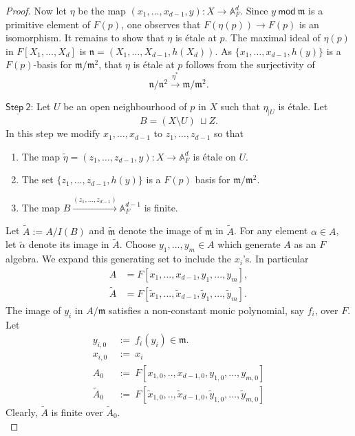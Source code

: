 \documentclass[10pt]{amsart}
\theoremstyle{plain}
\theoremstyle{definition}
\renewcommand{\tilde}{\widetilde}
\newcommand{\A}{{\mathbb A}}
\let\syn\mathsf
\newcommand{\Step}[1]{\underline{\syn{Step \ {#1}}}}
\newcommand{\scr}{\scriptscriptstyle}
\begin{document}
\begin{proof}
Now let $\eta$ be the map $(x_1,\ldots,x_{d-1},{y}):X \xrightarrow{} \A^d_F$. Since $y \ \syn{mod} \ \mathfrak{m}$ is a primitive element of $F(p)$, one observes that $F(\eta(p)) \to F(p)$ is an isomorphism. It remains to show that $\eta$ is \'{e}tale at $p$.  The maximal ideal of $\eta(p)$ in $F[X_1,...,X_d]$ is $\mathfrak{n}=(X_1,\ldots,X_{d-1},h(X_d))$.  
As $\{x_1,\ldots,x_{d-1},h(y)\}$ is a $F(p)$-basis for $\mathfrak{m}/\mathfrak{m}^2$, {that $\eta$ is \'{e}tale at $p$} follows from the surjectivity of 
$$\mathfrak{n}/\mathfrak{n}^2\xrightarrow{\eta^*}\mathfrak{m}/\mathfrak{m}^2 .$$


\noindent$\Step {2}$:
Let $U$ be an open neighbourhood  of $p$ in $X$ such that $\eta_{\scr{|U}}$ is \'{e}tale. Let $$ B= (X\setminus U) \ \sqcup Z.$$
In this step we modify $x_1,\ldots,x_{d-1}$ to $z_1,\ldots,z_{d-1}$ so that
\begin{enumerate}
\item  The map $\tilde{\eta}=(z_1,\ldots,z_{d-1},{y}):X \rightarrow \A^d_F$ is \'{e}tale on $U$.
\item The set $\{z_1,\ldots,z_{d-1},h({y})\}$ is a $F(p)$ basis for $\mathfrak{m}/\mathfrak{m}^2$. 
\item The map $B \xrightarrow{(z_1,\ldots,z_{d-1})}\A^{d-1}_F$ is finite.
\end{enumerate}

Let $\tilde{A}:= A/I(B)$ and $\tilde{\mathfrak{m}}$ denote the image of $\mathfrak{m}$ in $\tilde{A}$. For any element $\alpha \in A$, let $\tilde{\alpha}$ denote its image in $\tilde{A}$. Choose $y_1,...,y_m \in A$  which generate $A$ as an $F$ algebra. We expand this generating set to include the $x_i$'s. In particular  
\begin{align*}
A & = F[x_{\scr 1},...,x_{\scr d-1},y_{\scr 1},...,y_{\scr m}],\\
\tilde{A} & = F[\tilde{x}_{\scr 1},...,\tilde{x}_{\scr d-1},\tilde{y}_{\scr 1},...,\tilde{y}_{\scr m}].
\end{align*}
The image of $y_{\scr i}$ in $A/\mathfrak{m}$ satisfies a non-constant monic polynomial, say $f_{\scr i}$, over $F$. Let 
\begin{align*}
y_{\scr i,0} & \ :=\ f_i(y_{\scr i})  \in \mathfrak{m}.\\
x_{\scr i,0} & \ := \ x_{\scr i} \\ 
A_{\scr 0} & \ := \ F[x_{\scr 1,0},..,x_{\scr d-1,0},y_{\scr 1,0},...,y_{\scr m,0}] \\
\tilde{A}_{\scr 0} & \ := \ F[\tilde{x}_{\scr 1,0},..,\tilde{x}_{\scr d-1,0},\tilde{y}_{\scr 1,0},...,\tilde{y}_{\scr m,0}]
\end{align*}
Clearly, $\tilde{A}$ is finite over $\tilde{A}_{\scr 0}$. \\


\end{proof}
\end{document}
